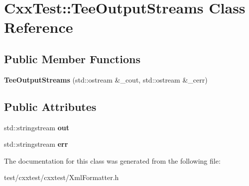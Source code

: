 \hypertarget{classCxxTest_1_1TeeOutputStreams}{\section{Cxx\-Test\-:\-:Tee\-Output\-Streams Class Reference}
\label{classCxxTest_1_1TeeOutputStreams}
}
\subsection*{Public Member Functions}
\begin{DoxyCompactItemize}
\item 
\hypertarget{classCxxTest_1_1TeeOutputStreams_a2340acad5a9952673bd441ef99232d12}{{\bfseries Tee\-Output\-Streams} (std\-::ostream \&\-\_\-cout, std\-::ostream \&\-\_\-cerr)}\label{classCxxTest_1_1TeeOutputStreams_a2340acad5a9952673bd441ef99232d12}

\end{DoxyCompactItemize}
\subsection*{Public Attributes}
\begin{DoxyCompactItemize}
\item 
\hypertarget{classCxxTest_1_1TeeOutputStreams_a0d3b93fe833b78f008215c942f7365ad}{std\-::stringstream {\bfseries out}}\label{classCxxTest_1_1TeeOutputStreams_a0d3b93fe833b78f008215c942f7365ad}

\item 
\hypertarget{classCxxTest_1_1TeeOutputStreams_a8a1d055ee2203dbbe20ffa02bd7021dc}{std\-::stringstream {\bfseries err}}\label{classCxxTest_1_1TeeOutputStreams_a8a1d055ee2203dbbe20ffa02bd7021dc}

\end{DoxyCompactItemize}


The documentation for this class was generated from the following file\-:\begin{DoxyCompactItemize}
\item 
test/cxxtest/cxxtest/Xml\-Formatter.\-h\end{DoxyCompactItemize}
